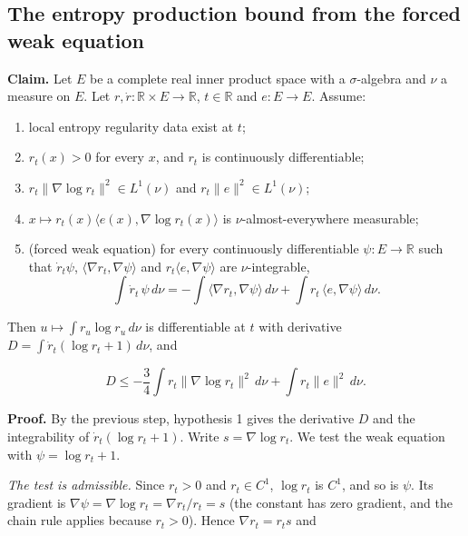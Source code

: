 \documentclass[11pt,a4paper]{report}
\begin{document}
\subsection{\texorpdfstring{The entropy production bound from the forced weak equation}{The entropy production bound from the forced weak equation}}
\label{report-step-UnadjustedLangevin-LSI-Regularity-lean-3}


\textbf{Claim.} Let \(E\) be a complete real inner product space with a \(\sigma\)-algebra and \(\nu\) a measure on \(E\). Let \(r,\dot r:\mathbb R\times E\to\mathbb R\), \(t\in\mathbb R\) and \(e:E\to E\). Assume:



\begin{enumerate}


\item local entropy regularity data exist at \(t\);

\item \(r_t(x)>0\) for every \(x\), and \(r_t\) is continuously differentiable;

\item \(r_t\|\nabla\log r_t\|^2\in L^1(\nu)\) and \(r_t\|e\|^2\in L^1(\nu)\);

\item \(x\mapsto r_t(x)\langle e(x),\nabla\log r_t(x)\rangle\) is \(\nu\)-almost-everywhere measurable;

\item (forced weak equation) for every continuously differentiable \(\psi:E\to\mathbb R\) such that \(\dot r_t\psi\), \(\langle\nabla r_t,\nabla\psi\rangle\) and \(r_t\langle e,\nabla\psi\rangle\) are \(\nu\)-integrable,
\[\int\dot r_t\,\psi\,d\nu=-\int\langle\nabla r_t,\nabla\psi\rangle\,d\nu+\int r_t\,\langle e,\nabla\psi\rangle\,d\nu.\]

\end{enumerate}



Then \(u\mapsto\int r_u\log r_u\,d\nu\) is differentiable at \(t\) with derivative \(D=\int\dot r_t(\log r_t+1)\,d\nu\), and


\[D\le-\frac34\int r_t\|\nabla\log r_t\|^2\,d\nu+\int r_t\|e\|^2\,d\nu.\]


\textbf{Proof.} By the previous step, hypothesis 1 gives the derivative \(D\) and the integrability of \(\dot r_t(\log r_t+1)\). Write \(s=\nabla\log r_t\). We test the weak equation with \(\psi=\log r_t+1\).




\emph{The test is admissible.} Since \(r_t>0\) and \(r_t\in C^1\), \(\log r_t\) is \(C^1\), and so is \(\psi\). Its gradient is \(\nabla\psi=\nabla\log r_t=\nabla r_t/r_t=s\) (the constant has zero gradient, and the chain rule applies because \(r_t>0\)). Hence \(\nabla r_t=r_ts\) and
\end{document}

